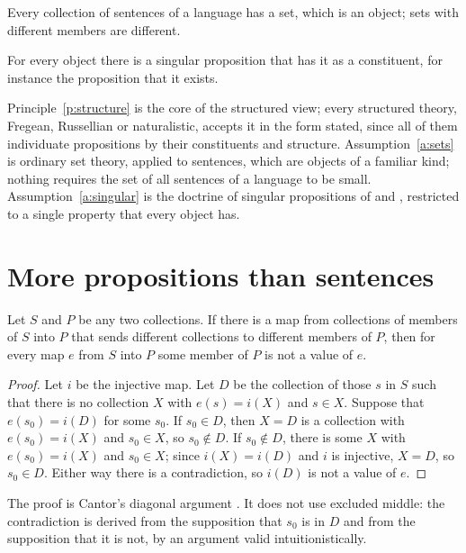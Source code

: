 \documentclass{situationist-preprint}
\begin{document}
\begin{assumption}\label{a:sets}
Every collection of sentences of a language has a set, which is an object; sets with different members are different.
\end{assumption}

\begin{assumption}\label{a:singular}
For every object there is a singular proposition that has it as a constituent, for instance the proposition that it exists.
\end{assumption}

Principle~\ref{p:structure} is the core of the structured view; every structured theory, Fregean, Russellian or naturalistic, accepts it in the form stated, since all of them individuate propositions by their constituents and structure. Assumption~\ref{a:sets} is ordinary set theory, applied to sentences, which are objects of a familiar kind; nothing requires the set of all sentences of a language to be small. Assumption~\ref{a:singular} is the doctrine of singular propositions of \citet{Kaplan1989} and \citet{Salmon1986}, restricted to a single property that every object has.

\section{More propositions than sentences}\label{s:card}

\begin{lemma}[Cantor]\label{l:diag}
Let $S$ and $P$ be any two collections. If there is a map from collections of members of $S$ into $P$ that sends different collections to different members of $P$, then for every map $e$ from $S$ into $P$ some member of $P$ is not a value of $e$.
\end{lemma}

\begin{proof}
Let $i$ be the injective map. Let $D$ be the collection of those $s$ in $S$ such that there is no collection $X$ with $e(s) = i(X)$ and $s \in X$. Suppose that $e(s_0) = i(D)$ for some $s_0$. If $s_0 \in D$, then $X = D$ is a collection with $e(s_0) = i(X)$ and $s_0 \in X$, so $s_0 \notin D$. If $s_0 \notin D$, there is some $X$ with $e(s_0) = i(X)$ and $s_0 \in X$; since $i(X) = i(D)$ and $i$ is injective, $X = D$, so $s_0 \in D$. Either way there is a contradiction, so $i(D)$ is not a value of $e$.
\end{proof}

The proof is Cantor's diagonal argument \citep{Cantor1891}. It does not use excluded middle: the contradiction is derived from the supposition that $s_0$ is in $D$ and from the supposition that it is not, by an argument valid intuitionistically.
\end{document}
